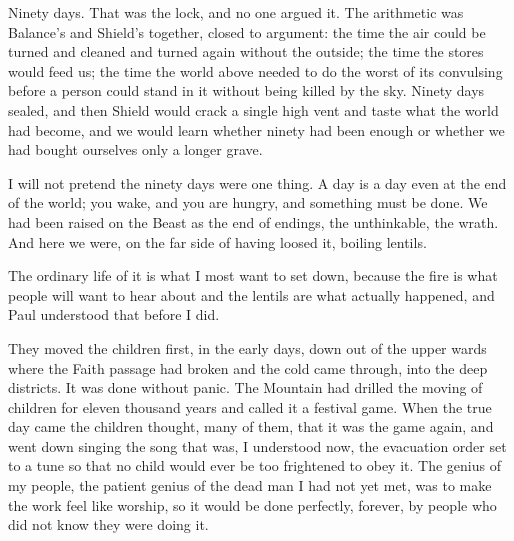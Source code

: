 \ornament

Ninety days. That was the lock, and no one argued it. The arithmetic was Balance's and Shield's together, closed to argument: the time the air could be turned and cleaned and turned again without the outside; the time the stores would feed us; the time the world above needed to do the worst of its convulsing before a person could stand in it without being killed by the sky. Ninety days sealed, and then Shield would crack a single high vent and taste what the world had become, and we would learn whether ninety had been enough or whether we had bought ourselves only a longer grave.\par

I will not pretend the ninety days were one thing. A day is a day even at the end of the world; you wake, and you are hungry, and something must be done. We had been raised on the Beast as the end of endings, the unthinkable, the wrath. And here we were, on the far side of having loosed it, boiling lentils.\par

\ornament

The ordinary life of it is what I most want to set down, because the fire is what people will want to hear about and the lentils are what actually happened, and Paul understood that before I did.\par

They moved the children first, in the early days, down out of the upper wards where the Faith passage had broken and the cold came through, into the deep districts. It was done without panic. The Mountain had drilled the moving of children for eleven thousand years and called it a festival game. When the true day came the children thought, many of them, that it was the game again, and went down singing the song that was, I understood now, the evacuation order set to a tune so that no child would ever be too frightened to obey it. The genius of my people, the patient genius of the dead man I had not yet met, was to make the work feel like worship, so it would be done perfectly, forever, by people who did not know they were doing it.\par

